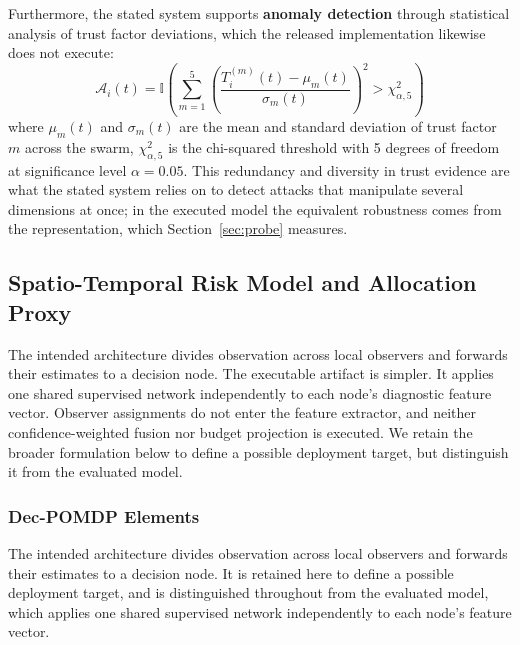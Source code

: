\documentclass[notspecified,article,submit,moreauthors]{Definitions/mdpi}
\begin{document}
Furthermore, the stated system supports \textbf{anomaly detection} through statistical analysis of trust factor deviations, which the released implementation likewise does not execute:
\begin{equation}\label{eq:anomaly}
\mathcal{A}_i(t) = \mathbb{I}\left( \sum_{m=1}^{5} \left( \frac{T_i^{(m)}(t) - \mu_m(t)}{\sigma_m(t)} \right)^2 > \chi^2_{\alpha,5} \right)
\end{equation}
where $\mu_m(t)$ and $\sigma_m(t)$ are the mean and standard deviation of trust factor $m$ across the swarm, $\chi^2_{\alpha,5}$ is the chi-squared threshold with 5 degrees of freedom at significance level $\alpha = 0.05$. This redundancy and diversity in trust evidence are what the stated system relies on to detect attacks that manipulate several dimensions at once; in the executed model the equivalent robustness comes from the representation, which Section~\ref{sec:probe} measures.

\subsection{Spatio-Temporal Risk Model and Allocation Proxy}
\label{sec:system_design}
The intended architecture divides observation across local observers and forwards their estimates to a decision node. The executable artifact is simpler. It applies one shared supervised network independently to each node's diagnostic feature vector. Observer assignments do not enter the feature extractor, and neither confidence-weighted fusion nor budget projection is executed. We retain the broader formulation below to define a possible deployment target, but distinguish it from the evaluated model.

\subsubsection{Dec-POMDP Elements}
The intended architecture divides observation across local observers and forwards their estimates to a decision node. It is retained here to define a possible deployment target, and is distinguished throughout from the evaluated model, which applies one shared supervised network independently to each node's feature vector.
\end{document}
